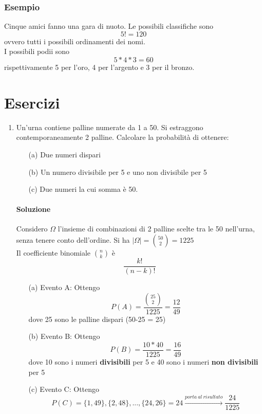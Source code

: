 \documentclass{report}
\begin{document}
\subsubsection{Esempio}
Cinque amici fanno una gara di nuoto. Le possibili classifiche sono \[5! = 120\] ovvero tutti i possibili ordinamenti dei nomi.\\
I possibili podii sono \[5*4*3 = 60\] rispettivamente 5 per l'oro, 4 per l'argento e 3 per il bronzo.
\section{Esercizi}
\begin{enumerate}
    \item Un'urna contiene palline numerate da 1 a 50. Si estraggono contemporaneamente 2 palline. Calcolare la probabilità di ottenere: \begin{itemize}
        \item [(a)] Due numeri dispari
        \item [(b)] Un numero divisibile per 5 e uno non divisibile per 5
        \item [(c)] Due numeri la cui somma è 50.
    \end{itemize}
    \paragraph{Soluzione} Considero \(\Omega\) l'insieme di combinazioni di 2 palline scelte tra le 50 nell'urna, senza tenere conto dell'ordine. Si ha \(|\Omega| = \binom{50}{2} = 1225\)\\
    Il coefficiente binomiale \(\binom{n}{k}\) è \[\frac{k!}{(n-k)!}\]
    \begin{itemize}
        \item [(a)] Evento A: Ottengo \[P(A) = \frac{\binom{25}{2}}{1225} = \frac{12}{49}\] dove 25 sono le palline dispari (50-25 = 25)
        \item [(b)] Evento B: Ottengo \[P(B) = \frac{10*40}{1225} = \frac{16}{49}\] dove 10 sono i numeri \textbf{divisibili} per 5 e 40 sono i numeri \textbf{non divisibili} per 5
        \item [(c)] Evento C: Ottengo \[P(C) = \{1,49\}, \{2, 48\}, ... , \{24, 26\} = 24 \xrightarrow{porta\ al\ risultato} \frac{24}{1225}\]
    \end{itemize} 

\end{enumerate}
\end{document}
